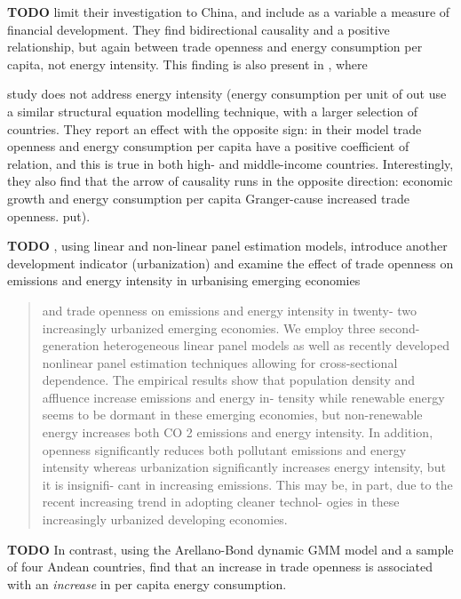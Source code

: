 \documentclass[12pt,a4paper]{article}
\begin{document}
\textbf{TODO}
\cite{shahbazDynamicLinksEnergy2013} limit their investigation to China, and include as a variable a measure of financial development. 
They find bidirectional causality and a positive relationship, but again between trade openness and energy consumption per capita, not energy intensity.
This finding is also present in \cite{kasmanCO2EmissionsEconomic2015}, where

 study does not address energy intensity (energy consumption per unit of out
\cite{tibaIncomeTradeOpenness2018} use a similar structural equation modelling technique, with a larger selection of countries. 
They report an effect with the opposite sign: in their model trade openness and energy consumption per capita have a positive coefficient of relation, and this is true in both high- and middle-income countries.
Interestingly, they also find that the arrow of causality runs in the opposite direction: economic growth and energy consumption per capita Granger-cause increased trade openness.
put).

\textbf{TODO}
\cite{rafiqUrbanizationOpennessEmissions2016}, using linear and non-linear panel estimation models, introduce another development indicator (urbanization) and examine the effect of trade openness on emissions and energy intensity in urbanising emerging economies
\begin{quote}
 and trade openness on emissions and energy intensity in twenty-
two increasingly urbanized emerging economies. We employ three second-generation heterogeneous linear
panel models as well as recently developed nonlinear panel estimation techniques allowing for cross-sectional
dependence. The empirical results show that population density and affluence increase emissions and energy in-
tensity while renewable energy seems to be dormant in these emerging economies, but non-renewable energy
increases both CO 2 emissions and energy intensity. In addition, openness significantly reduces both pollutant
emissions and energy intensity whereas urbanization significantly increases energy intensity, but it is insignifi-
cant in increasing emissions. This may be, in part, due to the recent increasing trend in adopting cleaner technol-
ogies in these increasingly urbanized developing economies.
\end{quote}

\textbf{TODO}
In contrast, using the Arellano-Bond dynamic GMM model and a sample of four Andean countries, \cite{koengkanPositiveImpactTrade2018} find that an increase in trade openness is associated with an 
\emph{increase} in per capita energy consumption. 
\end{document}
